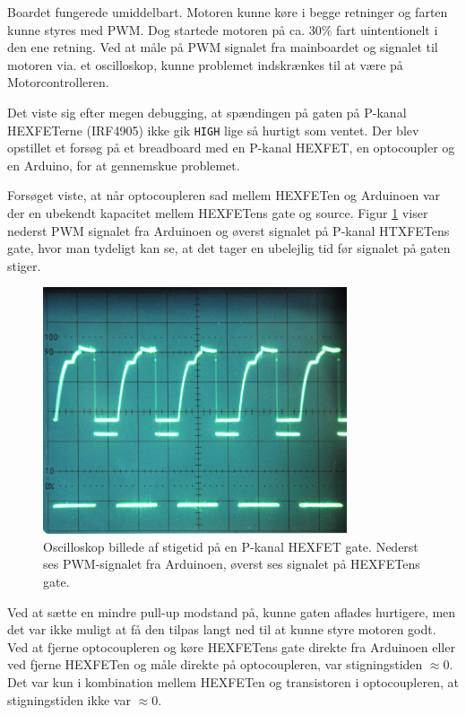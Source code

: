 \documentclass[a4paper,oneside,article,danish,table]{memoir}
\begin{document}

Boardet fungerede umiddelbart. Motoren kunne køre i begge retninger og farten kunne styres med PWM. Dog startede motoren på ca. 30\% fart uintentionelt i den ene retning. Ved at måle på PWM signalet fra mainboardet og signalet til motoren via. et oscilloskop, kunne problemet indskrænkes til at være på Motorcontrolleren.

Det viste sig efter megen debugging, at spændingen på gaten på P-kanal HEXFETerne (IRF4905) ikke gik \texttt{HIGH} lige så hurtigt som ventet. Der blev opstillet et forsøg på et breadboard med en P-kanal HEXFET, en optocoupler og en Arduino, for at gennemskue problemet.


Forsøget viste, at når optocoupleren sad mellem HEXFETen og Arduinoen var der en ubekendt kapacitet mellem HEXFETens gate og source. Figur \ref{fig:stigetid} viser nederst PWM signalet fra Arduinoen og øverst signalet på P-kanal HTXFETens gate, hvor man tydeligt kan se, at det tager en ubelejlig tid før signalet på gaten stiger.
\begin{figure}[htbp]
  \centering
  \includegraphics[width=0.8\textwidth]{pictures/stigetid.jpg}
  \caption[Oscilloskop billede af stigetid på en P-kanal HEXFET gate]{Oscilloskop billede af stigetid på en P-kanal HEXFET gate. Nederst ses PWM-signalet fra Arduinoen, øverst ses signalet på HEXFETens gate.}
  \label{fig:stigetid}
\end{figure}

Ved at sætte en mindre pull-up modstand på, kunne gaten aflades hurtigere, men det var ikke muligt at få den tilpas langt ned til at kunne styre motoren godt. Ved at fjerne optocoupleren og køre HEXFETens gate direkte fra Arduinoen eller ved fjerne HEXFETen og måle direkte på optocoupleren, var stigningstiden $\approx0$. Det var kun i kombination mellem HEXFETen og transistoren i optocoupleren, at stigningstiden ikke var $\approx0$.
\end{document}
